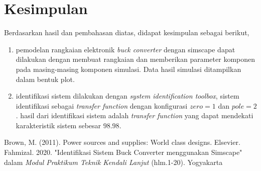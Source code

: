 \documentclass[../main.tex]{subfiles}
\begin{document}
    \section{Kesimpulan}
    Berdasarkan hasil dan pembahasan diatas, didapat kesimpulan sebagai berikut,
    \begin{enumerate}
        \item pemodelan rangkaian elektronik \textit{buck converter} dengan simscape dapat dilakukan dengan membuat rangkaian dan memberikan parameter komponen pada masing-masing komponen simulasi. Data hasil simulasi ditampilkan dalam bentuk plot. 
        \item identifikasi sistem dilakukan dengan \textit{system identification toolbox}, sistem identifikasi sebagai \textit{transfer function} dengan konfigurasi $zero = 1$ dan $pole = 2$. hasil dari identifikasi sistem adalah \textit{transfer function} yang dapat mendekati karakteristik sistem sebesar $98.98$.
    \end{enumerate}
    \pagebreak
    \begin{thebibliography}{1}
         Brown, M. (2011). Power sources and supplies: World class designs. Elsevier.
         Fahmizal. 2020. "Identifikasi Sistem Buck Converter menggunakan Simscape" dalam \textit{Modul Praktikum Teknik Kendali Lanjut} (hlm.1-20). Yogyakarta
    \end{thebibliography}
\end{document}
